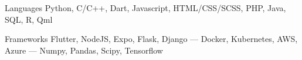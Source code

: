 
\begin{cvskills}
  \cvskill
    {Languages} %
    {Python, C/C++, Dart, Javascript, HTML/CSS/SCSS, PHP, Java, SQL, R, Qml} %

  \cvskill
    {Frameworks} %
    {Flutter, NodeJS, Expo, Flask, Django --- Docker, Kubernetes, AWS, Azure --- Numpy, Pandas, Scipy, Tensorflow} %
\end{cvskills}
